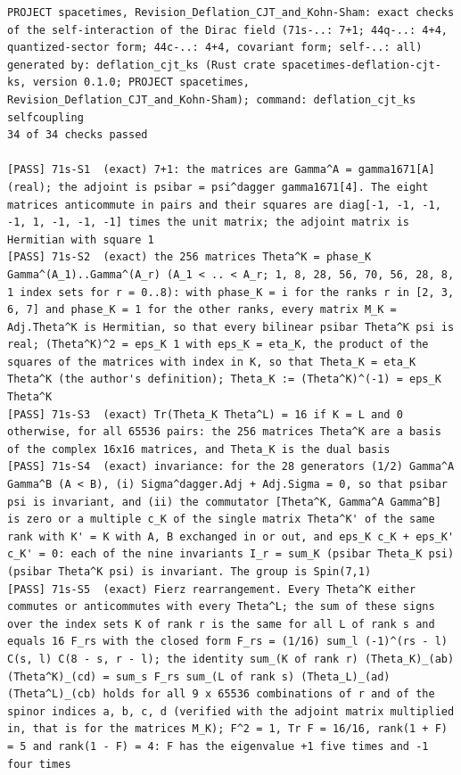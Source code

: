 \documentclass[
  10pt,
]{article}
\begin{document}
\begin{verbatim}
PROJECT spacetimes, Revision_Deflation_CJT_and_Kohn-Sham: exact checks of the self-interaction of the Dirac field (71s-..: 7+1; 44q-..: 4+4, quantized-sector form; 44c-..: 4+4, covariant form; self-..: all)
generated by: deflation_cjt_ks (Rust crate spacetimes-deflation-cjt-ks, version 0.1.0; PROJECT spacetimes, Revision_Deflation_CJT_and_Kohn-Sham); command: deflation_cjt_ks selfcoupling
34 of 34 checks passed

[PASS] 71s-S1  (exact) 7+1: the matrices are Gamma^A = gamma1671[A] (real); the adjoint is psibar = psi^dagger gamma1671[4]. The eight matrices anticommute in pairs and their squares are diag[-1, -1, -1, -1, 1, -1, -1, -1] times the unit matrix; the adjoint matrix is Hermitian with square 1
[PASS] 71s-S2  (exact) the 256 matrices Theta^K = phase_K Gamma^(A_1)..Gamma^(A_r) (A_1 < .. < A_r; 1, 8, 28, 56, 70, 56, 28, 8, 1 index sets for r = 0..8): with phase_K = i for the ranks r in [2, 3, 6, 7] and phase_K = 1 for the other ranks, every matrix M_K = Adj.Theta^K is Hermitian, so that every bilinear psibar Theta^K psi is real; (Theta^K)^2 = eps_K 1 with eps_K = eta_K, the product of the squares of the matrices with index in K, so that Theta_K = eta_K Theta^K (the author's definition); Theta_K := (Theta^K)^(-1) = eps_K Theta^K
[PASS] 71s-S3  (exact) Tr(Theta_K Theta^L) = 16 if K = L and 0 otherwise, for all 65536 pairs: the 256 matrices Theta^K are a basis of the complex 16x16 matrices, and Theta_K is the dual basis
[PASS] 71s-S4  (exact) invariance: for the 28 generators (1/2) Gamma^A Gamma^B (A < B), (i) Sigma^dagger.Adj + Adj.Sigma = 0, so that psibar psi is invariant, and (ii) the commutator [Theta^K, Gamma^A Gamma^B] is zero or a multiple c_K of the single matrix Theta^K' of the same rank with K' = K with A, B exchanged in or out, and eps_K c_K + eps_K' c_K' = 0: each of the nine invariants I_r = sum_K (psibar Theta_K psi)(psibar Theta^K psi) is invariant. The group is Spin(7,1)
[PASS] 71s-S5  (exact) Fierz rearrangement. Every Theta^K either commutes or anticommutes with every Theta^L; the sum of these signs over the index sets K of rank r is the same for all L of rank s and equals 16 F_rs with the closed form F_rs = (1/16) sum_l (-1)^(rs - l) C(s, l) C(8 - s, r - l); the identity sum_(K of rank r) (Theta_K)_(ab) (Theta^K)_(cd) = sum_s F_rs sum_(L of rank s) (Theta_L)_(ad) (Theta^L)_(cb) holds for all 9 x 65536 combinations of r and of the spinor indices a, b, c, d (verified with the adjoint matrix multiplied in, that is for the matrices M_K); F^2 = 1, Tr F = 16/16, rank(1 + F) = 5 and rank(1 - F) = 4: F has the eigenvalue +1 five times and -1 four times

\end{verbatim}
\end{document}
